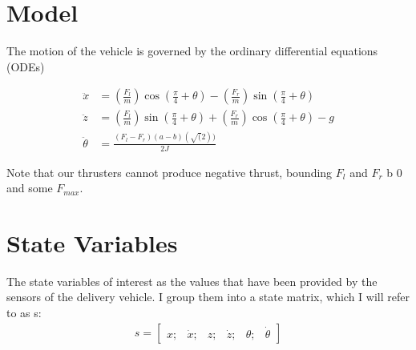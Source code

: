 \documentclass[a4paper,12pt]{article}
\begin{document}
\section{Model}
The motion of the vehicle is governed by the ordinary differential equations (ODEs)

\begin{align*}
\ddot{x} &= (\frac{F_{l}}{m})\cos(\frac{\pi}{4} + \theta) - (\frac{F_{r}}{m})\sin(\frac{\pi}{4} + \theta) \\
\ddot{z} &= (\frac{F_{l}}{m})\sin(\frac{\pi}{4} + \theta) + (\frac{F_{r}}{m})\cos(\frac{\pi}{4} + \theta) - g \\
\ddot{\theta} &= \frac{(F_{l} - F_{r})(a-b)(\sqrt(2))}{2J}
\end{align*}

Note that our thrusters cannot produce negative thrust, bounding $F_{l}$ and $F_{r}$ b 0 and some $F_{max}$. 

\section{State Variables}
The state variables of interest as the values that have been provided by the sensors of the delivery vehicle. I group them into a state matrix, which I will refer to as s:
\begin{align*}
s = \begin{bmatrix}
x ;& \dot{x} ;& z ;& \dot{z} ;& \theta ;& \dot{\theta}
\end{bmatrix}
\end{align*}
\end{document}
